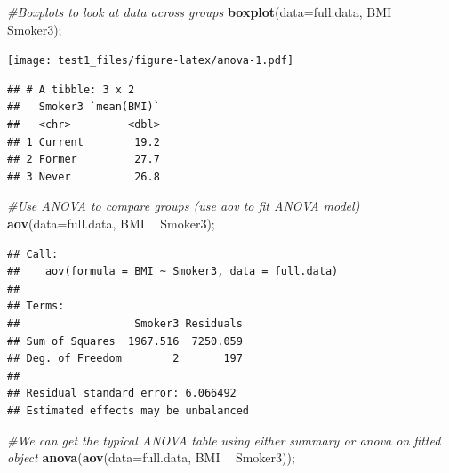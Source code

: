 \documentclass[
]{book}
\newenvironment{Shaded}{\begin{snugshade}}{\end{snugshade}}
\newcommand{\CommentTok}[1]{\textcolor[rgb]{0.56,0.35,0.01}{\textit{#1}}}
\newcommand{\DataTypeTok}[1]{\textcolor[rgb]{0.13,0.29,0.53}{#1}}
\newcommand{\KeywordTok}[1]{\textcolor[rgb]{0.13,0.29,0.53}{\textbf{#1}}}
\newcommand{\NormalTok}[1]{#1}
\newcommand{\OperatorTok}[1]{\textcolor[rgb]{0.81,0.36,0.00}{\textbf{#1}}}
\newcommand{\StringTok}[1]{\textcolor[rgb]{0.31,0.60,0.02}{#1}}
\begin{document}
\begin{Shaded}
\begin{Highlighting}[]
\CommentTok{#Boxplots to look at data across groups}
\KeywordTok{boxplot}\NormalTok{(}\DataTypeTok{data=}\NormalTok{full.data, BMI }\OperatorTok{~}\StringTok{ }\NormalTok{Smoker3);}
\end{Highlighting}
\end{Shaded}

\texttt{[image: test1\_files/figure-latex/anova-1.pdf]}

\begin{Shaded}
\end{Shaded}

\begin{verbatim}
## # A tibble: 3 x 2
##   Smoker3 `mean(BMI)`
##   <chr>         <dbl>
## 1 Current        19.2
## 2 Former         27.7
## 3 Never          26.8
\end{verbatim}

\begin{Shaded}
\begin{Highlighting}[]
\CommentTok{#Use ANOVA to compare groups (use aov to fit ANOVA model)}
\KeywordTok{aov}\NormalTok{(}\DataTypeTok{data=}\NormalTok{full.data, BMI }\OperatorTok{~}\StringTok{ }\NormalTok{Smoker3);}
\end{Highlighting}
\end{Shaded}

\begin{verbatim}
## Call:
##    aov(formula = BMI ~ Smoker3, data = full.data)
## 
## Terms:
##                  Smoker3 Residuals
## Sum of Squares  1967.516  7250.059
## Deg. of Freedom        2       197
## 
## Residual standard error: 6.066492
## Estimated effects may be unbalanced
\end{verbatim}

\begin{Shaded}
\begin{Highlighting}[]
\CommentTok{#We can get the typical ANOVA table using either summary or anova on fitted object}
\KeywordTok{anova}\NormalTok{(}\KeywordTok{aov}\NormalTok{(}\DataTypeTok{data=}\NormalTok{full.data, BMI }\OperatorTok{~}\StringTok{ }\NormalTok{Smoker3));}
\end{Highlighting}
\end{Shaded}
\end{document}
